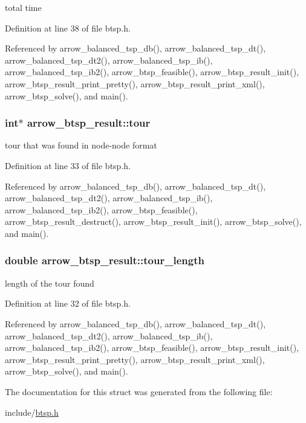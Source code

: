 total time 

Definition at line 38 of file btsp.h.

Referenced by arrow\_\-balanced\_\-tsp\_\-db(), arrow\_\-balanced\_\-tsp\_\-dt(), arrow\_\-balanced\_\-tsp\_\-dt2(), arrow\_\-balanced\_\-tsp\_\-ib(), arrow\_\-balanced\_\-tsp\_\-ib2(), arrow\_\-btsp\_\-feasible(), arrow\_\-btsp\_\-result\_\-init(), arrow\_\-btsp\_\-result\_\-print\_\-pretty(), arrow\_\-btsp\_\-result\_\-print\_\-xml(), arrow\_\-btsp\_\-solve(), and main().\hypertarget{structarrow__btsp__result_ebd9a553dc3bf31f52eda0b293b0e272}{
\subsubsection[{tour}]{\setlength{\rightskip}{0pt plus 5cm}int$\ast$ {\bf arrow\_\-btsp\_\-result::tour}}}
\label{structarrow__btsp__result_ebd9a553dc3bf31f52eda0b293b0e272}


tour that was found in node-node format 

Definition at line 33 of file btsp.h.

Referenced by arrow\_\-balanced\_\-tsp\_\-db(), arrow\_\-balanced\_\-tsp\_\-dt(), arrow\_\-balanced\_\-tsp\_\-dt2(), arrow\_\-balanced\_\-tsp\_\-ib(), arrow\_\-balanced\_\-tsp\_\-ib2(), arrow\_\-btsp\_\-feasible(), arrow\_\-btsp\_\-result\_\-destruct(), arrow\_\-btsp\_\-result\_\-init(), arrow\_\-btsp\_\-solve(), and main().\hypertarget{structarrow__btsp__result_3c0b8827a873df71166e7fe9419c45c2}{
\subsubsection[{tour\_\-length}]{\setlength{\rightskip}{0pt plus 5cm}double {\bf arrow\_\-btsp\_\-result::tour\_\-length}}}
\label{structarrow__btsp__result_3c0b8827a873df71166e7fe9419c45c2}


length of the tour found 

Definition at line 32 of file btsp.h.

Referenced by arrow\_\-balanced\_\-tsp\_\-db(), arrow\_\-balanced\_\-tsp\_\-dt(), arrow\_\-balanced\_\-tsp\_\-dt2(), arrow\_\-balanced\_\-tsp\_\-ib(), arrow\_\-balanced\_\-tsp\_\-ib2(), arrow\_\-btsp\_\-feasible(), arrow\_\-btsp\_\-result\_\-init(), arrow\_\-btsp\_\-result\_\-print\_\-pretty(), arrow\_\-btsp\_\-result\_\-print\_\-xml(), arrow\_\-btsp\_\-solve(), and main().

The documentation for this struct was generated from the following file:\begin{CompactItemize}
\item 
include/\hyperlink{btsp_8h}{btsp.h}\end{CompactItemize}

